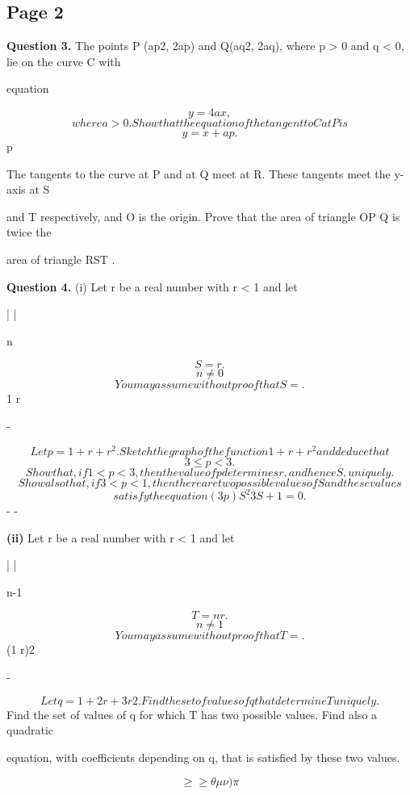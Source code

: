 \documentclass[12pt]{article}
\begin{document}
\subsection*{Page 2}
\begin{flushleft}
\bigskip\textbf{Question 3.} The points P (ap2, 2ap) and Q(aq2, 2aq), where p > 0 and q < 0, lie on the curve C with\par
equation\par
\[y = 4ax ,\]
\[where a > 0 . Show that the equation of the tangent to C at P is\]
\[y = x + ap .\]
p\par
The tangents to the curve at P and at Q meet at R. These tangents meet the y-axis at S\par
and T respectively, and O is the origin. Prove that the area of triangle OP Q is twice the\par
area of triangle RST .\par
\bigskip\textbf{Question 4.} (i) Let r be a real number with r < 1 and let\par
| |\par
\infty\par
n\par
\[S = r .\]
\[n\ne0\]
\[You may assume without proof that S = .\]
1 r\par
-\par
\[Let p = 1 + r + r^2. Sketch the graph of the function 1 + r + r^2 and deduce that\]
\[3 \leq p < 3 .\]
\[Show that, if 1 < p < 3, then the value of p determines r, and hence S, uniquely.\]
\[Show also that, if 3 < p < 1, then there are two possible values of S and these values\]
\[satisfy the equation (3 p)S^2 3S + 1 = 0.\]
- -\par
\textbf{(ii)} Let r be a real number with r < 1 and let\par
| |\par
\infty\par
n-1\par
\[T = nr .\]
\[n\ne1\]
\[You may assume without proof that T = .\]
(1 r)2\par
-\par
\[Let q = 1 + 2r + 3r2. Find the set of values of q that determine T uniquely.\]
Find the set of values of q for which T has two possible values. Find also a quadratic\par
equation, with coefficients depending on q, that is satisfied by these two values.\par
\[\geq\geq\theta\mu\nu) \pi\]
\end{flushleft}
\end{document}
